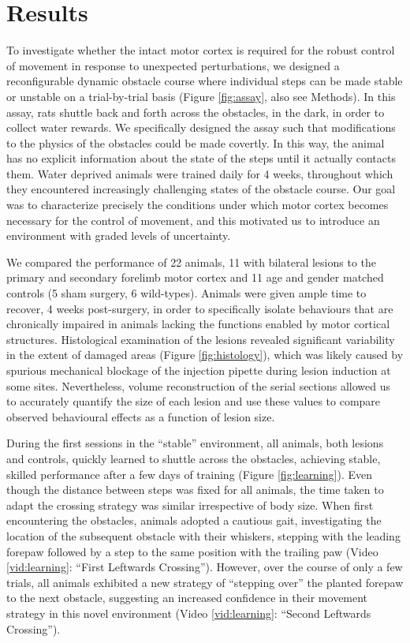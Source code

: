 \section{Results}

To investigate whether the intact motor cortex is required for the robust control of movement in response to unexpected perturbations, we designed a reconfigurable dynamic obstacle course where individual steps can be made stable or unstable on a trial-by-trial basis (Figure \ref{fig:assay}, also see Methods). In this assay, rats shuttle back and forth across the obstacles, in the dark, in order to collect water rewards. We specifically designed the assay such that modifications to the physics of the obstacles could be made covertly. In this way, the animal has no explicit information about the state of the steps until it actually contacts them. Water deprived animals were trained daily for 4 weeks, throughout which they encountered increasingly challenging states of the obstacle course. Our goal was to characterize precisely the conditions under which motor cortex becomes necessary for the control of movement, and this motivated us to introduce an environment with graded levels of uncertainty.

We compared the performance of 22 animals, 11 with bilateral lesions to the primary and secondary forelimb motor cortex and 11 age and gender matched controls (5 sham surgery, 6 wild-types). Animals were given ample time to recover, 4 weeks post-surgery, in order to specifically isolate behaviours that are chronically impaired in animals lacking the functions enabled by motor cortical structures. Histological examination of the lesions revealed significant variability in the extent of damaged areas (Figure \ref{fig:histology}), which was likely caused by spurious mechanical blockage of the injection pipette during lesion induction at some sites. Nevertheless, volume reconstruction of the serial sections allowed us to accurately quantify the size of each lesion and use these values to compare observed behavioural effects as a function of lesion size.

During the first sessions in the ``stable'' environment, all animals, both lesions and controls, quickly learned to shuttle across the obstacles, achieving stable, skilled performance after a few days of training (Figure \ref{fig:learning}). Even though the distance between steps was fixed for all animals, the time taken to adapt the crossing strategy was similar irrespective of body size. When first encountering the obstacles, animals adopted a cautious gait, investigating the location of the subsequent obstacle with their whiskers, stepping with the leading forepaw followed by a step to the same position with the trailing paw (Video \ref{vid:learning}: ``First Leftwards Crossing''). However, over the course of only a few trials, all animals exhibited a new strategy of ``stepping over'' the planted forepaw to the next obstacle, suggesting an increased confidence in their movement strategy in this novel environment (Video \ref{vid:learning}: ``Second Leftwards Crossing'').

